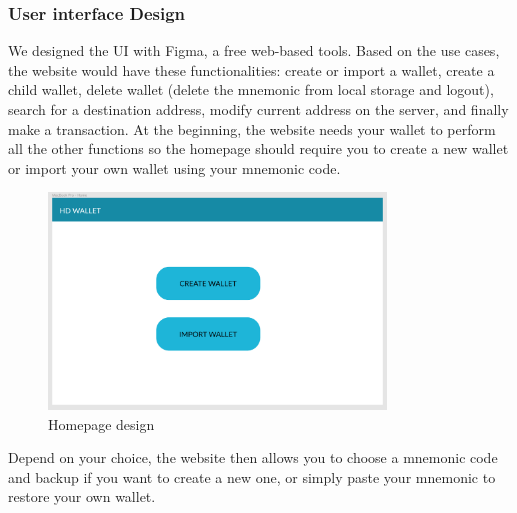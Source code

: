 \subsubsection{User interface Design}
\bigskip

We designed the UI with Figma, a free web-based tools. Based on the use cases, the website would have these functionalities: create or import a wallet, create a child wallet, delete wallet (delete the mnemonic from local storage and logout), search for a destination address, modify current address on the server, and finally make a transaction. At the beginning, the website needs your wallet to perform all the other functions so the homepage should require you to create a new wallet or import your own wallet using your mnemonic code.

\begin{figure}[!h]
  \centering
  \includegraphics[width=0.8\textwidth]{images/component01.png}
  \caption[Homepage design]{Homepage design}
  \label{fig:homepage_desgin}
\end{figure}


Depend on your choice, the website then allows you to choose a mnemonic code and backup if you want to create a new one, or simply paste your mnemonic to restore your own wallet.


